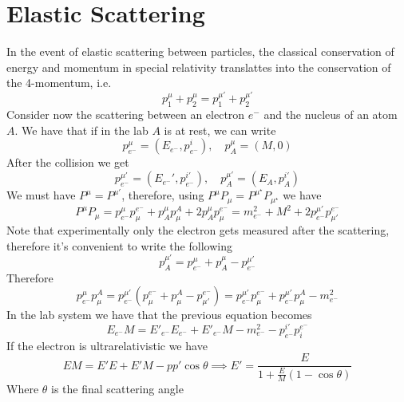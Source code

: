 \documentclass[../admech.tex]{subfiles}
\begin{document}
\section{Elastic Scattering}
In the event of elastic scattering between particles, the classical conservation of energy and momentum in special relativity translattes into the conservation of the 4-momentum, i.e.
\begin{equation}
	p^\mu_1+p^\mu_2=p^{\mu'}_1+p^{\mu'}_2
	\label{eq:4momcons}
\end{equation}
Consider now the scattering between an electron $e^-$ and the nucleus of an atom $A$. We have that if in the lab $A$ is at rest, we can write
\begin{equation}
	p^\mu_{e^-}=\left( E_{e^-},p^i_{e^-} \right),\quad p^\mu_A=(M,0)
	\label{eq:electronatomscattering4mom}
\end{equation}
After the collision we get
\begin{equation}
	p^{\mu'}_{e^-}=\left( E_{e^-}',p^{i'}_{e^-} \right),\quad p^{\mu'}_A=\left( E_A,p_A^{i'} \right)
	\label{eq:e-ascatt}
\end{equation}
We must have $P^\mu=P^{\mu'}$, therefore, using $P^\mu P_\mu=P^{\mu^\star}P_{\mu^\star}$ we have
\begin{equation}
	P^\mu P_\mu=p^{\mu}_{e^-}p^{e^-}_{\mu}+p^\mu_Ap^A_\mu+2p_A^\mu p_\mu^{e^-}=m_{e^-}^2+M^2+2p_{e^-}^{\mu'}p_{\mu'}^{e^-}
	\label{eq:tot4momcons}
\end{equation}
Note that experimentally only the electron gets measured after the scattering, therefore it's convenient to write the following
\begin{equation*}
	p^{\mu'}_A=p_{e^-}^\mu+p_A^\mu-p^{\mu'}_{e^-}
\end{equation*}
Therefore
\begin{equation*}
	p^\mu_{e^-}p_\mu^A=p^{\mu'}_{e^-}\left( p^{e^-}_\mu+p_\mu^A-p^{e^-}_{\mu'} \right)=p^{\mu'}_{e^-}p^{e^-}_{\mu}+p^{\mu'}_{e^-}p^A_\mu-m_{e^-}^2
\end{equation*}
In the lab system we have that the previous equation becomes
\begin{equation*}
	E_{e^-}M=E'_{e^-}E_{e^-}+E'_{e^-}M-m^2_{e^-}-p^{i'}_{e^-}p_{i}^{e^-}
\end{equation*}
If the electron is ultrarelativistic we have
\begin{equation}
	EM=E'E+E'M-pp'\cos\theta\implies E'=\frac{E}{1+\frac{E}{M}\left( 1-\cos\theta \right)}
	\label{eq:ultrarelativisticemscattera}
\end{equation}
Where $\theta$ is the final scattering angle
\end{document}
